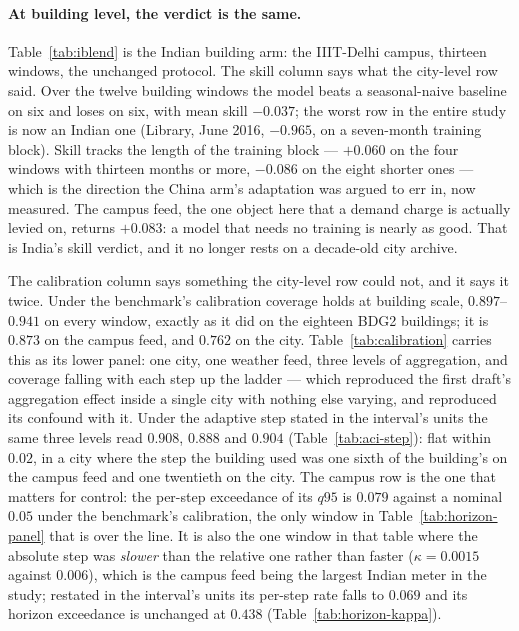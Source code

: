 

\paragraph{At building level, the verdict is the same.} Table~\ref{tab:iblend}
is the Indian building arm: the IIIT-Delhi campus, thirteen windows, the
unchanged protocol. The skill column says what the city-level row said. Over
the twelve building windows the model beats a seasonal-naive baseline on six
and loses on six, with mean skill $-0.037$; the worst row in the entire study
is now an Indian one (Library, June 2016, $-0.965$, on a seven-month training
block). Skill tracks the length of the training block --- $+0.060$ on the four
windows with thirteen months or more, $-0.086$ on the eight shorter ones ---
which is the direction the China arm's adaptation was argued to err in, now
measured. The campus feed, the one object here that a demand charge is actually
levied on, returns $+0.083$: a model that needs no training is nearly as good.
That is India's skill verdict, and it no longer rests on a decade-old city
archive.

The calibration column says something the city-level row could not, and it
says it twice. Under the benchmark's calibration coverage holds at building
scale, $0.897$--$0.941$ on every window, exactly as it did on the eighteen BDG2
buildings; it is $0.873$ on the campus feed, and $0.762$ on the city.
Table~\ref{tab:calibration} carries this as its lower panel: one city, one
weather feed, three levels of aggregation, and coverage falling with each step
up the ladder --- which reproduced the first draft's aggregation effect inside
a single city with nothing else varying, and reproduced its confound with it.
Under the adaptive step stated in the interval's units the same three levels
read $0.908$, $0.888$ and $0.904$ (Table~\ref{tab:aci-step}): flat within
$0.02$, in a city where the step the building used was one sixth of the
building's on the campus feed and one twentieth on the city. The campus row is
the one that matters for control: the per-step exceedance of its $q95$ is
$0.079$ against a nominal $0.05$ under the benchmark's calibration, the only
window in Table~\ref{tab:horizon-panel} that is over the line. It is also the
one window in that table where the absolute step was \emph{slower} than the
relative one rather than faster ($\kappa=0.0015$ against $0.006$), which is
the campus feed being the largest Indian meter in the study; restated in the
interval's units its per-step rate falls to $0.069$ and its horizon exceedance
is unchanged at $0.438$ (Table~\ref{tab:horizon-kappa}).


